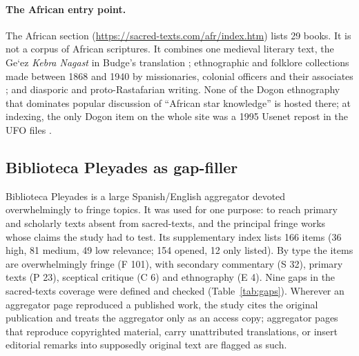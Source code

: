 \documentclass[11pt,a4paper]{article}
\begin{document}
\paragraph{The African entry point.} The African section (\url{https://sacred-texts.com/afr/index.htm}) lists 29 books. It is not a corpus of African scriptures. It combines one medieval literary text, the Ge`ez \emph{Kebra Nagast} in Budge's translation \parencite{budge1922kebra}; ethnographic and folklore collections made between 1868 and 1940 by missionaries, colonial officers and their associates \parencite[e.g.][]{callaway1870religious,theal1886kaffir,dennett1898fjort,ellis1894yoruba,bleeklloyd1911,wyndham1921ife,werner1933bantu,wpa1940drums}; and diasporic and proto-Rastafarian writing. None of the Dogon ethnography that dominates popular discussion of ``African star knowledge'' is hosted there; at indexing, the only Dogon item on the whole site was a 1995 Usenet repost in the UFO files \parencite{dolan1995dogon}.

\subsection{Biblioteca Pleyades as gap-filler}

Biblioteca Pleyades is a large Spanish/English aggregator devoted overwhelmingly to fringe topics. It was used for one purpose: to reach primary and scholarly texts absent from sacred-texts, and the principal fringe works whose claims the study had to test. Its supplementary index lists 166 items (36 high, 81 medium, 49 low relevance; 154 opened, 12 only listed). By type the items are overwhelmingly fringe (F 101), with secondary commentary (S 32), primary texts (P 23), sceptical critique (C 6) and ethnography (E 4). Nine gaps in the sacred-texts coverage were defined and checked (Table~\ref{tab:gaps}). Wherever an aggregator page reproduced a published work, the study cites the original publication and treats the aggregator only as an access copy; aggregator pages that reproduce copyrighted material, carry unattributed translations, or insert editorial remarks into supposedly original text are flagged as such.
\end{document}
